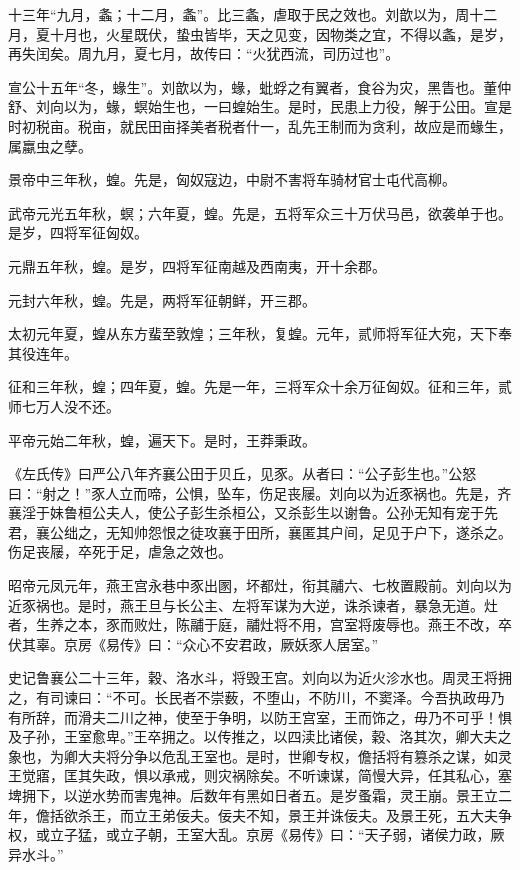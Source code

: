 \documentclass[12pt,UTF8]{ctexbook}
\begin{document}
十三年“九月，螽；十二月，螽”。比三螽，虐取于民之效也。刘歆以为，周十二月，夏十月也，火星既伏，蛰虫皆毕，天之见变，因物类之宜，不得以螽，是岁，再失闰矣。周九月，夏七月，故传曰：“火犹西流，司历过也”。



宣公十五年“冬，蝝生”。刘歆以为，蝝，蚍蜉之有翼者，食谷为灾，黑眚也。董仲舒、刘向以为，蝝，螟始生也，一曰蝗始生。是时，民患上力役，解于公田。宣是时初税亩。税亩，就民田亩择美者税者什一，乱先王制而为贪利，故应是而蝝生，属蠃虫之孽。



景帝中三年秋，蝗。先是，匈奴寇边，中尉不害将车骑材官士屯代高柳。



武帝元光五年秋，螟；六年夏，蝗。先是，五将军众三十万伏马邑，欲袭单于也。是岁，四将军征匈奴。



元鼎五年秋，蝗。是岁，四将军征南越及西南夷，开十余郡。



元封六年秋，蝗。先是，两将军征朝鲜，开三郡。



太初元年夏，蝗从东方蜚至敦煌；三年秋，复蝗。元年，贰师将军征大宛，天下奉其役连年。



征和三年秋，蝗；四年夏，蝗。先是一年，三将军众十余万征匈奴。征和三年，贰师七万人没不还。



平帝元始二年秋，蝗，遍天下。是时，王莽秉政。



《左氏传》曰严公八年齐襄公田于贝丘，见豕。从者曰：“公子彭生也。”公怒曰：“射之！”豕人立而啼，公惧，坠车，伤足丧屦。刘向以为近豕祸也。先是，齐襄淫于妹鲁桓公夫人，使公子彭生杀桓公，又杀彭生以谢鲁。公孙无知有宠于先君，襄公绌之，无知帅怨恨之徒攻襄于田所，襄匿其户间，足见于户下，遂杀之。伤足丧屦，卒死于足，虐急之效也。



昭帝元凤元年，燕王宫永巷中豕出圂，坏都灶，衔其鬴六、七枚置殿前。刘向以为近豕祸也。是时，燕王旦与长公主、左将军谋为大逆，诛杀谏者，暴急无道。灶者，生养之本，豕而败灶，陈鬴于庭，鬴灶将不用，宫室将废辱也。燕王不改，卒伏其辜。京房《易传》曰：“众心不安君政，厥妖豕人居室。”



史记鲁襄公二十三年，穀、洛水斗，将毁王宫。刘向以为近火沴水也。周灵王将拥之，有司谏曰：“不可。长民者不崇薮，不堕山，不防川，不窦泽。今吾执政毋乃有所辞，而滑夫二川之神，使至于争明，以防王宫室，王而饰之，毋乃不可乎！惧及子孙，王室愈卑。”王卒拥之。以传推之，以四渎比诸侯，穀、洛其次，卿大夫之象也，为卿大夫将分争以危乱王室也。是时，世卿专权，儋括将有篡杀之谋，如灵王觉寤，匡其失政，惧以承戒，则灾祸除矣。不听谏谋，简慢大异，任其私心，塞埤拥下，以逆水势而害鬼神。后数年有黑如日者五。是岁蚤霜，灵王崩。景王立二年，儋括欲杀王，而立王弟佞夫。佞夫不知，景王并诛佞夫。及景王死，五大夫争权，或立子猛，或立子朝，王室大乱。京房《易传》曰：“天子弱，诸侯力政，厥异水斗。”
\end{document}
